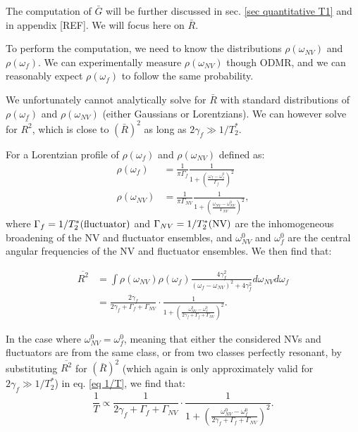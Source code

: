 \documentclass[a4paper, 11pt]{book}
\begin{document}
The computation of $\bar G$ will be further discussed in sec. \ref{sec quantitative T1} and in appendix [REF]. We will focus here on $\bar R$.

To perform the computation, we need to know the distributions $\rho(\omega_{NV})$ and $\rho(\omega_{f})$. We can experimentally measure $\rho(\omega_{NV})$ though ODMR, and we can reasonably expect $\rho(\omega_{f})$ to follow the same probability.

We unfortunately cannot analytically solve for $\bar R$ with standard distributions of $\rho(\omega_{f})$ and $\rho(\omega_{NV})$ (either Gaussians or Lorentzians). We can however solve for $\overline{R^2}$, which is close to $(\bar{R})^2$ as long as $2 \gamma_f \gg 1/T_2^*$.

For a Lorentzian profile of $\rho(\omega_{f})$ and $\rho(\omega_{NV})$ defined as:
\begin{align*}
\rho(\omega_{f})&=\frac{1}{\pi \Gamma_f} \frac{1}{1+ \left(\frac{\omega_f-\omega^0_f}{\Gamma_f}\right)^2} \\
\rho(\omega_{NV})&=\frac{1}{\pi \Gamma_{NV}} \frac{1}{1+ \left(\frac{\omega_{NV}-\omega^0_{NV}}{\Gamma_{NV}}\right)^2},
\end{align*}
where $\Gamma_{f}=1/T_2^*(\rm fluctuator)$ and $\Gamma_{NV}=1/T_2^*(\rm NV)$ are the inhomogeneous broadening of the NV and fluctuator ensembles, and $\omega^0_{NV}$ and $\omega^0_{f}$ are the central angular frequencies of the NV and fluctuator ensembles. We then find that:

\begin{align*}
\overline{R^2}&= \int \rho(\omega_{NV}) \rho(\omega_{f}) \frac{4\gamma_f^2}{(\omega_f - \omega_{NV})^2+4\gamma_f^2} d\omega_{NV} d\omega_{f} \\
&=\frac{2 \gamma_f}{2 \gamma_f + \Gamma_f + \Gamma_{NV}} \cdot \frac{1}{1+\left(\frac{\omega^0_{NV}-\omega^0_{f}}{2 \gamma_f + \Gamma_f + \Gamma_{NV}}\right)^2}.
\end{align*}

In the case where $\omega^0_{NV}=\omega^0_{f}$, meaning that either the considered NVs and fluctuators are from the same class, or from two classes perfectly resonant, by substituting $\overline{R ^2}$ for $(\bar{R})^2$ (which again is only approximately valid for $2 \gamma_f \gg 1/T_2^*$) in eq. \ref{eq 1/T}, we find that:
\begin{equation}
\label{eq 1/T avec T2*}
\frac{1}{T} \propto \frac{1}{2\gamma_f + \Gamma_f + \Gamma_{NV}}\cdot \frac{1}{1+\left(\frac{\omega^0_{NV}-\omega^0_{f}}{2 \gamma_f + \Gamma_f + \Gamma_{NV}}\right)^2}.
\end{equation}
\end{document}
